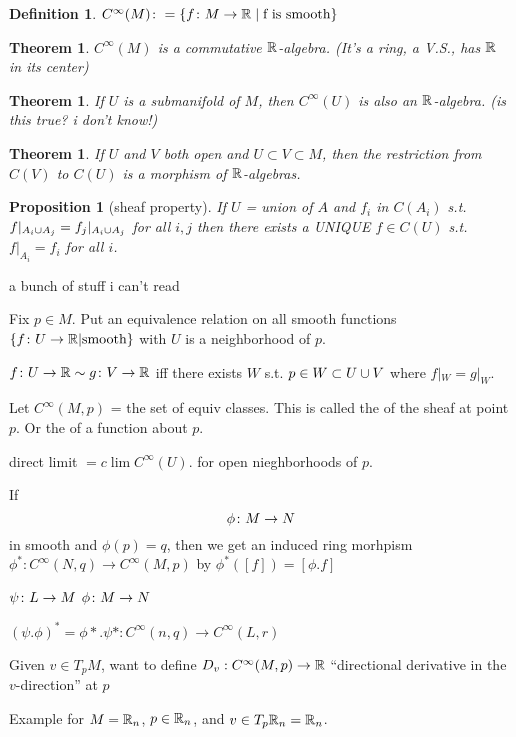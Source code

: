 \documentclass[11pt]{amsbook}
\newenvironment{dateenv}{
	\vspace{1em}
}{
	\vspace{1em}
}
\newcommand{\mydate}[4]{
	\newdate{#1}{#2}{#3}{#4}
	\begin{dateenv}
		\hfill\displaydate{#1}
	\end{dateenv}
}
\theoremstyle{mystyle} %
\newtheorem{thrm}[thm]{Theorem}
\newtheorem{defi}[thm]{Definition}
\newtheorem{propo}[thm]{Proposition}
\numberwithin{thm}{section}
\begin{document}
\mydate{d4}{5}{10}{2016}

\begin{defi}
	$C^\infty(M) \colon = \{ f \colon M \to {\mathbb R} \mid \text{f is smooth} \}$
\end{defi}
\begin{thrm}
	$C^\infty(M)$ is a commutative ${\mathbb R}$-algebra. (It's a ring, a V.S., has ${\mathbb R}$ in its center)
\end{thrm}
\begin{thrm}
	If $U$ is a submanifold of $M$, then $C^\infty(U)$ is also an ${\mathbb R}$-algebra.
	(is this true?  i don't know!)
\end{thrm}
\begin{thrm}
	If $U$ and $V$ both open and $U \subset V \subset M$, then
	the restriction from $C(V)$ to $C(U)$ is a morphism of ${\mathbb R}$-algebras.
\end{thrm}
\begin{propo}[sheaf property]
	If $U$ = union of $A$
	and $f_i$ in $C(A_i)$ s.t. $f|_{A_i \cup A_j} = f_j|_{A_i \cup A_j}$ for all $i, j$
	then there exists a UNIQUE $f \in C(U)$ s.t. $f|_{A_i} = f_i$ for all $i$.
\end{propo}

a bunch of stuff i can't read

Fix $p \in M$.
Put an equivalence relation on all smooth functions $\{ f \colon U \to {\mathbb R} | \text{smooth}\}$
with $U$ is a neighborhood of $p$.

$f\colon U \to {\mathbb R} \sim g\colon V \to {\mathbb R}$
iff
there exists $W$ s.t. $p \in W \subset U \cup V$ where $f|_W = g|_W$.

Let $C^\infty(M,p)$ = the set of equiv classes.  This is called the  of the sheaf at point $p$.  Or the  of a function about $p$.

direct limit
$= c\lim C^\infty(U)$.
for open nieghborhoods of $p$.

If $$\phi\colon M \to N$$ in smooth and $\phi(p) = q$, then we get an induced ring morhpism
$\phi^* : C^\infty(N,q) \to C^\infty(M,p)$ by
$\phi^*([f]) = [\phi.f]$

$\psi \colon L \to M$
$\phi \colon M \to N$

$(\psi.\phi)^* = \phi*.\psi* : C^\infty(n,q) \to C^\infty(L,r)$

Given $v \in T_pM$, want to define
$D_v : C^\infty(M,p) \to {\mathbb R}$
``directional derivative in the $v$-direction'' at $p$

Example for $M = {\mathbb R}_n$, $p \in {\mathbb R}_n$, and $v \in T_p{\mathbb R}_n = {\mathbb R}_n$.
\end{document}

